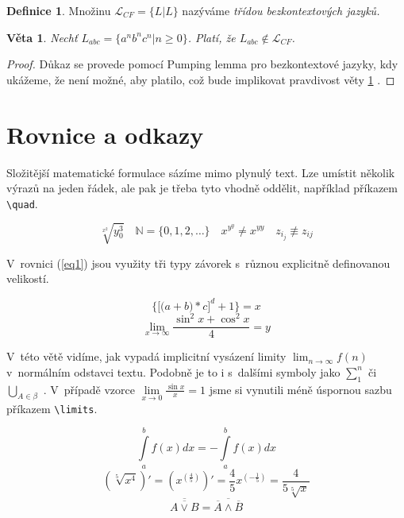 \documentclass[a4paper, 11pt]{article}
\newtheorem{veta}{Věta}
\theoremstyle{definition}
\newtheorem{definice}{Definice}[section]
\theoremstyle{definition}
\begin{document}
\begin{definice} Množinu ${\mathcal{L}}_{CF}=\{L|L\}$ nazýváme \emph{třídou bezkontextových jazyků.} \end{definice}

\begin{veta} \label{veta} Nechť $L_{abc}=\{a^nb^nc^n|n\geq0\}$. Platí, že $L_{abc} \not \in \mathcal{L}_{CF}$. \end{veta}

\begin{proof}Důkaz se provede pomocí Pumping lemma pro bezkontextové jazyky, kdy ukážeme, že není možné, aby platilo, což bude implikovat pravdivost věty \ref{veta} . \end{proof}

\section{Rovnice a odkazy}

Složitější matematické formulace sázíme mimo plynulý text. Lze umístit několik výrazů na jeden řádek, ale pak je třeba tyto vhodně oddělit, například příkazem \verb|\quad|. 

$$\sqrt[x^2]{y^3_0} \quad \mathbb{N} = \{0,1,2,\ldots\} \quad x^{y^y} \not= x^{yy} \quad z_{i_j} \not \equiv z_{ij} $$

V~rovnici (\ref{eq1}) jsou využity tři typy závorek s~různou explicitně definovanou velikostí.

\begin{equation} \label{eq1}
	\bigg \{ \Big [\big (a+b\big )*c\Big ]^d+1\bigg \}=x 	
\end{equation}
$$
\lim_{x\rightarrow \infty} \frac{\sin^2 x + \cos^2 x}{4} = y
$$

V~této větě vidíme, jak vypadá implicitní vysázení limity $\lim_{n \rightarrow \infty} f(n)$ v~normálním odstavci textu. Podobně je to i s~dalšími symboly jako $\sum_1^n$ či $\bigcup_{A \in \beta}$ . V~případě vzorce $\lim\limits_{x \rightarrow 0} {\frac{\sin x}{x}=1}$ jsme si vynutili méně úspornou sazbu příkazem \verb|\limits|.

\begin{equation}
	\int\limits_a^b f(x)dx = -\int\limits_a^b f(x)dx
\end{equation}
\begin{equation}
	(\sqrt[5]{x^4})' = (x^(\frac{4}{5}))' = \frac{4}{5}x^(-\frac{1}{5}) = \frac{4}{5\sqrt[5]{x}} 
\end{equation}
\begin{equation}
	\overline{\overline{A \vee B}} = \overline{\overline{A} \wedge \overline{B}}
\end{equation}
\end{document}
